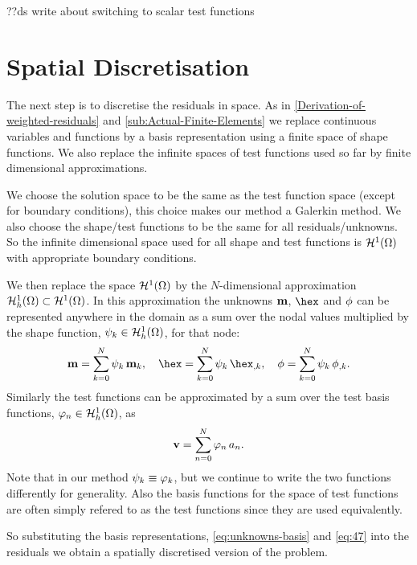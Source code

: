 ??ds write about switching to scalar test functions


\section{Spatial Discretisation}
\label{sec:spat-discr-resi}

The next step is to discretise the residuals in space. As in \autoref{Derivation-of-weighted-residuals} and \ref{sub:Actual-Finite-Elements} we replace continuous variables and functions by a basis representation using a finite space of shape functions. We also replace the infinite spaces of test functions used so far by finite dimensional approximations.

We choose the solution space to be the same as the test function space (except for boundary conditions), this choice makes our method a Galerkin method. We also choose the shape/test functions to be the same for all residuals/unknowns. So the infinite dimensional space used for all shape and test functions is $\mathcal{H}^1(\Omega)$ with appropriate boundary conditions.

We then replace the space $\mathcal{H}^1(\Omega)$ by the $N$-dimensional approximation ${\mathcal{H}^1_h(\Omega)} \subset \mathcal{H}^1(\Omega)$. In this approximation the unknowns $\mathbf{m}$, $\hex$ and $\phi$ can be represented anywhere in the domain as a sum over the nodal values multiplied by the shape function, ${\psi_k} \in {\mathcal{H}^1_h(\Omega)}$, for that node:
\begin{gather} %
  \mv = \sum_{k = 0}^{N} \sk \, \mv_k, \quad
  \hex = \sum_{k = 0}^{N} \sk \, \hex_{,k}, \quad
  \phim = \sum_{k = 0}^{N} \sk \, \phim_{,k}.
  \label{eq:unknowns-basis}
\end{gather}
Similarly the test functions can be approximated by a sum over the test basis functions, ${\varphi_n} \in {\mathcal{H}^1_h(\Omega)}$, as
\begin{equation}
  \label{eq:47}
  \mathbf{v} = \sum_{n = 0}^{N} {\varphi_n} \, a_n.
\end{equation}
Note that in our method $\psi_k \equiv \varphi_k$, but we continue to write the two functions differently for generality. Also the basis functions for the space of test functions are often simply refered to as the test functions since they are used equivalently.

So substituting the basis representations, \eqref{eq:unknowns-basis} and \eqref{eq:47} into the residuals we obtain a spatially discretised version of the problem.


